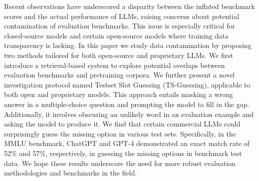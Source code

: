 Recent observations have underscored a disparity between the inflated benchmark scores and the actual performance of LLMs, raising concerns about potential contamination of evaluation benchmarks. This issue is especially critical for closed-source models and certain open-source models where training data transparency is lacking. In this paper we study data contamination by proposing two methods tailored for both open-source and proprietary LLMs. We first introduce a retrieval-based system to explore potential overlaps between evaluation benchmarks and pretraining corpora. We further present a novel investigation protocol named Testset Slot Guessing (TS-Guessing), applicable to both open and proprietary models. This approach entails masking a wrong answer in a multiple-choice question and prompting the model to fill in the gap. Additionally, it involves obscuring an unlikely word in an evaluation example and asking the model to produce it. We find that certain commercial LLMs could surprisingly guess the missing option in various test sets. Specifically, in the MMLU benchmark, ChatGPT and GPT-4 demonstrated an exact match rate of 52\% and 57\%, respectively, in guessing the missing options in benchmark test data. We hope these results underscore the need for more robust evaluation methodologies and benchmarks in the field.